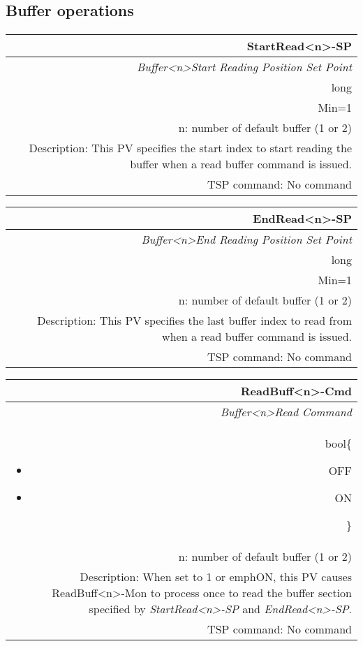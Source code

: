 \documentclass[openany]{article}
\begin{document}
	\subsection{Buffer operations}\label{pvgroup:buffer-operations}

		\paragraph{} %

		\begin{tabular}{N}
			\hline
			\bfseries StartRead\textless n\textgreater-SP\label{pv:startread-sp} \\ \hline
			\emph{Buffer\textless n\textgreater Start Reading Position Set Point} \\
			long \\
			Min=1 \\
			n: number of default buffer (1 or 2) \\
			Description: This PV specifies the start index to start reading the buffer when a read buffer command is issued. \\
			TSP command: No command
		\end{tabular}

		\begin{tabular}{N}
			\hline
			\bfseries EndRead\textless n\textgreater-SP\label{pv:endread-sp} \\ \hline
			\emph{Buffer\textless n\textgreater End Reading Position Set Point} \\
			long \\
			Min=1 \\
			n: number of default buffer (1 or 2) \\
			Description: This PV specifies the last buffer index to read from when a read buffer command is issued. \\
			TSP command: No command
		\end{tabular}

		\begin{tabular}{N}
			\hline
			\bfseries ReadBuff\textless n\textgreater-Cmd\label{pv:readbuff-cmd} \\ \hline
			\emph{Buffer\textless n\textgreater Read Command} \\
			bool\{\begin{itemize}[noitemsep]
				\small
				\item[] OFF
				\item[] ON
			\end{itemize}\} \\
			n: number of default buffer (1 or 2) \\
			Description: When set to 1 or emph{ON}, this PV causes ReadBuff\textless n\textgreater-Mon to process once to read the buffer section specified by \emph{StartRead\textless n\textgreater-SP} and \emph{EndRead\textless n\textgreater-SP}. \\
			TSP command: No command
		\end{tabular}
\end{document}
